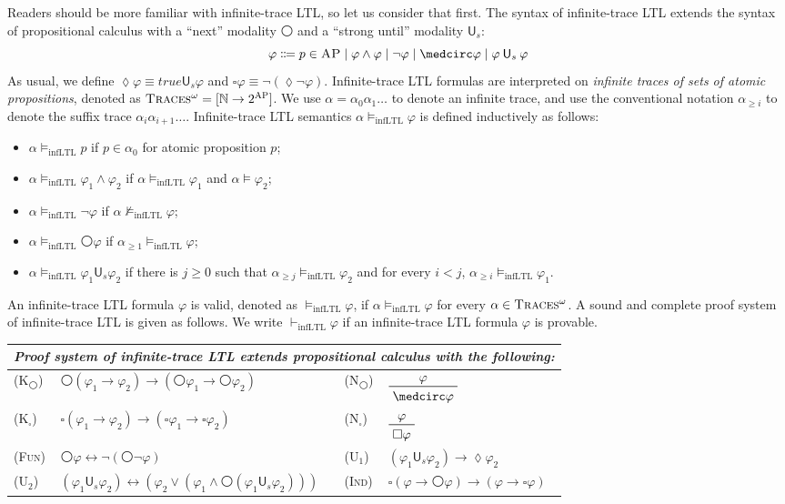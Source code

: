 \documentclass[acmsmall,review,anonymous]{acmart}
\newcommand{\imp}{\to}
\newcommand{\dimp}{\leftrightarrow}
\newcommand{\pset}[1]{2^{#1}}
\newcommand{\infLTL}{\mathrm{infLTL}}
\newcommand{\prule}[1]{\textsc{(#1)}}
\newcommand{\AP}{\textsc{AP}}
\newcommand{\true}{\mathit{true}}
\newcommand{\wnext}{{\medcirc}}
\newcommand{\always}{{\square}}
\newcommand{\eventually}{{\lozenge}}
\newcommand{\Us}{\mathbin{\mathsf{U}_s}}
\newcommand{\infTraces}{\textsc{Traces$^\omega$}\xspace}
\newcommand{\NN}{\mathbb{N}}
\begin{document}
Readers should be more familiar with infinite-trace LTL, 
so let us consider that first.
The syntax of infinite-trace LTL 
extends the syntax of propositional calculus
with a ``next'' modality $\wnext$ 
and a ``strong until'' modality $\mathsf{U}_s$:
$$
\varphi \Coloneqq p \in \AP
\mid \varphi \wedge \varphi
\mid \neg \varphi
\mid \wnext \varphi
\mid \varphi \Us \varphi
$$
As usual,
we define $\eventually \varphi \equiv \true \Us \varphi$
and $\always \varphi \equiv \neg (\eventually \neg \varphi)$.
Infinite-trace LTL formulas are interpreted on 
\emph{infinite traces of sets of atomic propositions},
denoted as $\infTraces = [ \NN \to \pset{\AP}]$.
We use $\alpha = \alpha_0\alpha_1\dots$
to denote an infinite trace,
and use the conventional notation
$\alpha_{\ge i}$ to denote the suffix trace
$\alpha_i \alpha_{i+1} \dots$.
Infinite-trace LTL semantics $\alpha \vDash_\infLTL \varphi$ is defined 
inductively as follows:
\begin{itemize}
\item $\alpha \vDash_\infLTL p$ if $p \in \alpha_0$ for atomic proposition $p$;
\item $\alpha \vDash_\infLTL \varphi_1 \wedge \varphi_2$
if $\alpha \vDash_\infLTL \varphi_1$ and $\alpha \vDash \varphi_2$;
\item $\alpha \vDash_\infLTL \neg \varphi$
if $\alpha \not\vDash_\infLTL \varphi$;
\item $\alpha  \vDash_\infLTL \wnext \varphi$
if $\alpha_{\ge 1} \vDash_\infLTL \varphi$;
\item $\alpha \vDash_\infLTL \varphi_1 \Us \varphi_2$
if there is $j \ge 0$ such that
$\alpha_{\ge j} \vDash_\infLTL \varphi_2$ and for every $i < j$,
$\alpha_{\ge i} \vDash_\infLTL \varphi_1$.
\end{itemize}
An infinite-trace LTL formula $\varphi$ is valid,
denoted as $\vDash_\infLTL \varphi$,
if $\alpha \vDash_\infLTL \varphi$ 
for every $\alpha \in \infTraces$.
A sound and complete proof system of infinite-trace LTL
is given as follows.
We write $\vdash_\infLTL \varphi$
if an infinite-trace LTL formula $\varphi$ is provable.
\begin{center}
\begin{tabular}{lm{6cm}lm{3.8cm}}
\multicolumn{4}{l}{
\em
Proof system of infinite-trace LTL extends propositional calculus with the following:
}
\\\hline
\prule{K$_\wnext$}
&
$\wnext (\varphi_1 \imp \varphi_2) \imp (\wnext \varphi_1 \imp \wnext 
\varphi_2)$
&
\prule{N$_\wnext$}
&
$\prftree{\varphi}{\wnext \varphi}$
\\
\prule{K$_\always$}
&
$\always (\varphi_1 \imp \varphi_2) \imp (\always \varphi_1 \imp \always 
\varphi_2)$
&
\prule{N$_\always$}
&
$\prftree{\varphi}{\always \varphi}$
\\
\prule{Fun}
&
$\wnext \varphi \dimp \neg (\wnext \neg \varphi)$
&
\prule{U$_1$}
&
$(\varphi_1 \Us \varphi_2) \imp \eventually \varphi_2$
\\
\prule{U$_2$}
&
$(\varphi_1 \Us \varphi_2) 
\dimp 
(\varphi_2 \vee (\varphi_1 \wedge \wnext (\varphi_1 \Us \varphi_2)))$
&
\prule{Ind}
&
$\always(\varphi \imp \wnext \varphi) \imp (\varphi \imp \always \varphi)$
\end{tabular}
\end{center}
\end{document}
